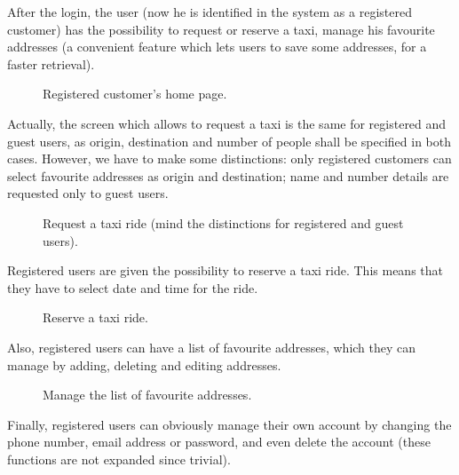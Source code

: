 After the login, the user (now he is identified in the system as a registered customer) has the possibility to request or reserve a taxi, manage his favourite addresses (a convenient feature which lets users to save some addresses, for a faster retrieval).

\begin{figure}%
	\hfill%
	\hfill%
	\caption{Registered customer's home page.}\label{fig:logged}
\end{figure}

\clearpage

Actually, the screen which allows to request a taxi is the same for registered and guest users, as origin, destination and number of people shall be specified in both cases. However, we have to make some distinctions: only registered customers can select favourite addresses as origin and destination; name and number details are requested only to guest users. 

\begin{figure}%
	\hfill%
	\hfill%
	\hfill%
	\caption{Request a taxi ride (mind the distinctions for registered and guest users).}\label{fig:request}
\end{figure}

Registered users are given the possibility to reserve a taxi ride. This means that they have to select date and time for the ride. 

\begin{figure}%
	\hfill%
	\hfill%
	\caption{Reserve a taxi ride.}\label{fig:reservation}
\end{figure}

\clearpage

Also, registered users can have a list of favourite addresses, which they can manage by adding, deleting and editing addresses.

\begin{figure}%
	\hfill%
	\hfill%
	\hfill%
	\caption{Manage the list of favourite addresses.}\label{fig:manageAddresses}
\end{figure}

Finally, registered users can obviously manage their own account by changing the phone number, email address or password, and even delete the account (these functions are not expanded since trivial).

